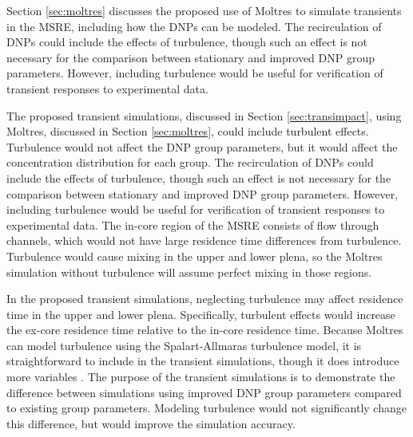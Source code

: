 \renewcommand{\theequation}{C\thechapter.\arabic{equation}}
\label{sec:appendixC}

Section \ref{sec:moltres} discusses the proposed use of Moltres to simulate transients in the \gls{MSRE}, including how the \glspl{DNP} can be modeled.
The recirculation of \glspl{DNP} could include the effects of turbulence, though such an effect is not necessary for the comparison between stationary and improved \gls{DNP} group parameters.
However, including turbulence would be useful for verification of transient responses to experimental data.

The proposed transient simulations, discussed in Section \ref{sec:transimpact}, using Moltres, discussed in Section \ref{sec:moltres}, could include turbulent effects.
Turbulence would not affect the \gls{DNP} group parameters, but it would affect the concentration distribution for each group.
The recirculation of \glspl{DNP} could include the effects of turbulence, though such an effect is not necessary for the comparison between stationary and improved \gls{DNP} group parameters.
However, including turbulence would be useful for verification of transient responses to experimental data.
The in-core region of the \gls{MSRE} consists of flow through channels, which would not have large residence time differences from turbulence.
Turbulence would cause mixing in the upper and lower plena, so the Moltres simulation without turbulence will assume perfect mixing in those regions.

In the proposed transient simulations, neglecting turbulence may affect residence time in the upper and lower plena.
Specifically, turbulent effects would increase the ex-core residence time relative to the in-core residence time.
Because Moltres can model turbulence using the Spalart-Allmaras turbulence model, it is straightforward to include in the transient simulations, though it does introduce more variables \cite{spalart_one-equation_1992, park_advancements_2025}.
The purpose of the transient simulations is to demonstrate the difference between simulations using improved \gls{DNP} group parameters compared to existing group parameters.
Modeling turbulence would not significantly change this difference, but would improve the simulation accuracy.


